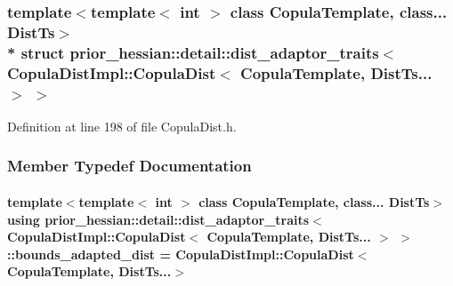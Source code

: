\subsubsection*{template$<$template$<$ int $>$ class Copula\+Template, class... Dist\+Ts$>$\\*
struct prior\+\_\+hessian\+::detail\+::dist\+\_\+adaptor\+\_\+traits$<$ Copula\+Dist\+Impl\+::\+Copula\+Dist$<$ Copula\+Template, Dist\+Ts... $>$ $>$}



Definition at line 198 of file Copula\+Dist.\+h.



\subsubsection{Member Typedef Documentation}
\paragraph[{\texorpdfstring{bounds\+\_\+adapted\+\_\+dist}{bounds_adapted_dist}}]{\setlength{\rightskip}{0pt plus 5cm}template$<$template$<$ int $>$ class Copula\+Template, class... Dist\+Ts$>$ using {\bf prior\+\_\+hessian\+::detail\+::dist\+\_\+adaptor\+\_\+traits}$<$ {\bf Copula\+Dist\+Impl\+::\+Copula\+Dist}$<$ Copula\+Template, Dist\+Ts... $>$ $>$\+::{\bf bounds\+\_\+adapted\+\_\+dist} =  {\bf Copula\+Dist\+Impl\+::\+Copula\+Dist}$<$Copula\+Template, Dist\+Ts...$>$}\hypertarget{structprior__hessian_1_1detail_1_1dist__adaptor__traits_3_01CopulaDistImpl_1_1CopulaDist_3_01Cop7279db6753e87d864b5bda4f78bd9862_ae3a35bd30510bdacae57d72ed37817f9}{}\label{structprior__hessian_1_1detail_1_1dist__adaptor__traits_3_01CopulaDistImpl_1_1CopulaDist_3_01Cop7279db6753e87d864b5bda4f78bd9862_ae3a35bd30510bdacae57d72ed37817f9}



